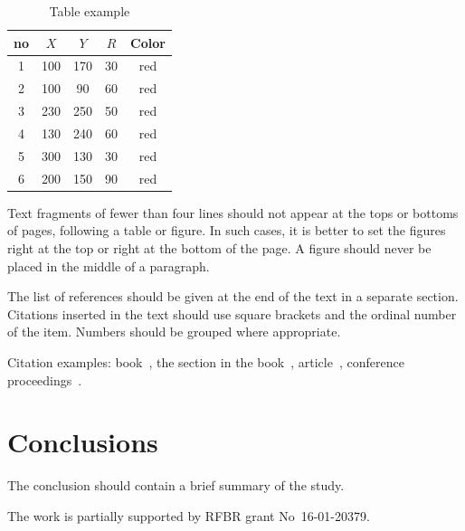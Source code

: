 \documentclass[60x84/16,8pt]{ittmm}
\begin{document}
{\begin{table}[b]
  \centering
  \caption{Table example}
  \label{tab:sampletable}
  \begin{tabular}{|c|c|c|c|c|}
    \hline
    no & $X$ & $Y$ & $R$ & Color\\
    \hline
    1 &     100  &  170 & 30 & red\\
    2 &     100  &  90  & 60 & red\\
    3 &     230  &  250 & 50 & red\\
    4 &     130  &  240 & 60 & red\\
    5 & 300  &      130 & 30 & red\\
    6 &     200  &  150     & 90 & red\\
    \hline
  \end{tabular}
\end{table}

Text fragments of fewer than four lines should not appear at the tops
or bottoms of pages, following a table or figure. In such cases, it is
better to set the figures right at the top or right at the bottom of
the page. A figure should never be placed in the middle of a
paragraph.

The list of references should be given at the end of the text in a
separate section. Citations inserted in the text should use square
brackets and the ordinal number of the item. Numbers should be grouped
where appropriate.

Citation examples: book~\cite{mathtensor,
  jones-fogelin:tcqd}, the section in the book~\cite{Muller2006},
article~\cite{Arduengo1991, Booth1962},
conference proceedings~\cite{Hope2005}.

\section{Conclusions}

The conclusion should contain a brief summary of the study.

\begin{acknowledgments}
  The work is partially supported by RFBR grant No~16-01-20379.
\end{acknowledgments}




}
\end{document}
